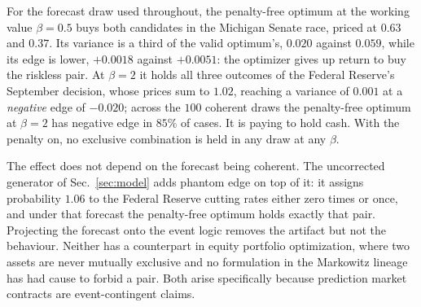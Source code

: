 \documentclass[aps, reprint, prl, twocolumn, superscriptaddress,amsmath,amssymb,noeprint]{revtex4-2}
\begin{document}
For the forecast draw used throughout, the penalty-free optimum at the
working value $\beta = 0.5$ buys both candidates in the Michigan Senate race,
priced at $0.63$ and $0.37$.  Its variance is a third of the valid optimum's,
$0.020$ against $0.059$, while its edge is lower, $+0.0018$ against $+0.0051$:
the optimizer gives up return to buy the riskless pair.  At $\beta = 2$ it
holds all three outcomes of the Federal Reserve's September decision, whose
prices sum to $1.02$, reaching a variance of $0.001$ at a \emph{negative}
edge of $-0.020$; across the $100$ coherent draws the penalty-free optimum at
$\beta = 2$ has negative edge in $85\%$ of cases.  It is paying to hold cash.
With the penalty on, no exclusive combination is held in any draw at any
$\beta$.

The effect does not depend on the forecast being coherent.  The uncorrected
generator of Sec.~\ref{sec:model} adds phantom edge on top of it: it assigns
probability $1.06$ to the Federal Reserve cutting rates either zero times or
once, and under that forecast the penalty-free optimum holds exactly that pair.
Projecting the forecast onto the event logic removes the artifact but not the
behaviour.  Neither has a counterpart in equity portfolio optimization, where
two assets are never mutually exclusive and no formulation in the Markowitz
lineage has had cause to forbid a pair.  Both arise specifically because
prediction market contracts are event-contingent claims.
\end{document}
